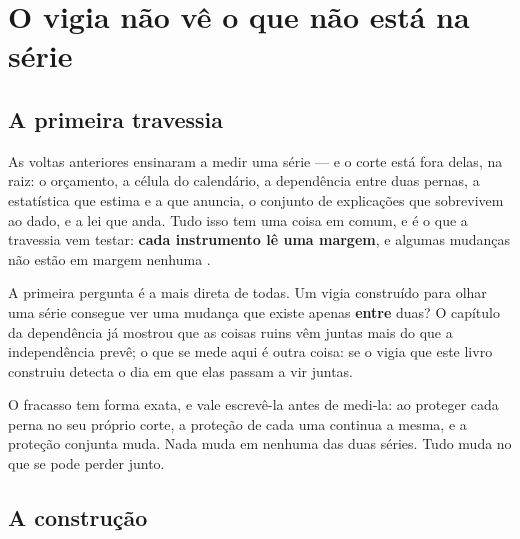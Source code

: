 %
%

\chapter{O vigia não vê o que não está na série}
\label{cap:dependencia_vigiada}

\section{A primeira travessia}

As voltas anteriores ensinaram a medir uma série --- e o corte está fora delas, na raiz: o orçamento, a
célula do calendário, a dependência entre duas pernas, a estatística que estima e a que anuncia, o
conjunto de explicações que sobrevivem ao dado, e a lei que anda. Tudo
isso tem uma coisa em comum, e é o que a travessia vem testar: \textbf{cada instrumento lê uma margem},
e algumas mudanças não estão em margem nenhuma \cite{ansari2021sklar}.

A primeira pergunta é a mais direta de todas. Um vigia construído para
olhar uma série consegue ver uma mudança que existe apenas \textbf{entre} duas? O capítulo da
dependência já mostrou que as coisas ruins vêm juntas mais do que a independência prevê; o que se mede aqui é outra coisa: se o vigia que este livro construiu detecta o dia em que elas
passam a vir juntas.

O fracasso tem forma exata, e vale escrevê-la antes de medi-la: ao proteger cada perna no seu
próprio corte, a proteção de cada uma continua a mesma, e a proteção conjunta muda. Nada muda em
nenhuma das duas séries. Tudo muda no que se pode perder junto.

\section{A construção}

